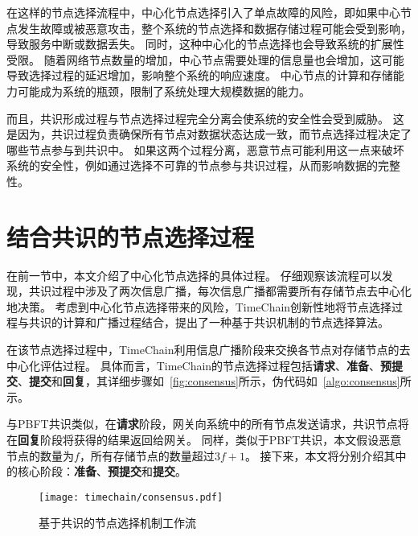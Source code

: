 在这样的节点选择流程中，中心化节点选择引入了单点故障的风险，即如果中心节点发生故障或被恶意攻击，整个系统的节点选择和数据存储过程可能会受到影响，导致服务中断或数据丢失。
同时，这种中心化的节点选择也会导致系统的扩展性受限。
随着网络节点数量的增加，中心节点需要处理的信息量也会增加，这可能导致选择过程的延迟增加，影响整个系统的响应速度。
中心节点的计算和存储能力可能成为系统的瓶颈，限制了系统处理大规模数据的能力。

而且，共识形成过程与节点选择过程完全分离会使系统的安全性会受到威胁。
这是因为，共识过程负责确保所有节点对数据状态达成一致，而节点选择过程决定了哪些节点参与到共识中。
如果这两个过程分离，恶意节点可能利用这一点来破坏系统的安全性，例如通过选择不可靠的节点参与共识过程，从而影响数据的完整性。

\section{结合共识的节点选择过程}

在前一节中，本文介绍了中心化节点选择的具体过程。
仔细观察该流程可以发现，共识过程中涉及了两次信息广播，每次信息广播都需要所有存储节点去中心化地决策。
考虑到中心化节点选择带来的风险，TimeChain创新性地将节点选择过程与共识的计算和广播过程结合，提出了一种基于共识机制的节点选择算法。

在该节点选择过程中，TimeChain利用信息广播阶段来交换各节点对存储节点的去中心化评估过程。
具体而言，TimeChain的节点选择过程包括\textbf{请求}、\textbf{准备}、\textbf{预提交}、\textbf{提交}和\textbf{回复}，其详细步骤如~\autoref{fig:consensus}所示，伪代码如~\autoref{algo:consensus}所示。

与PBFT共识类似，在\textbf{请求}阶段，网关向系统中的所有节点发送请求，共识节点将在\textbf{回复}阶段将获得的结果返回给网关。
同样，类似于PBFT共识，本文假设恶意节点的数量为$f$，所有存储节点的数量超过$3f+1$。
接下来，本文将分别介绍其中的核心阶段：\textbf{准备}、\textbf{预提交}和\textbf{提交}。

\begin{figure}[t]
    \centering
    \texttt{[image: timechain/consensus.pdf]}
    \caption{基于共识的节点选择机制工作流}
    \label{fig:consensus}
\end{figure}

